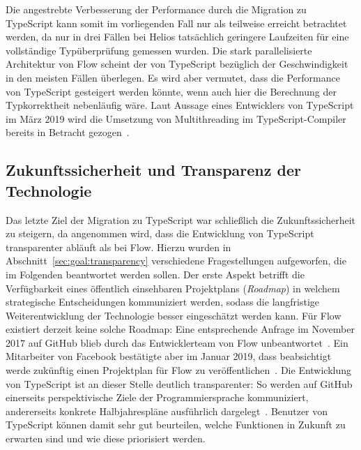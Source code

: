 Die angestrebte Verbesserung der Performance durch die Migration zu TypeScript kann somit im vorliegenden Fall nur als teilweise erreicht betrachtet werden, da nur in drei Fällen bei Helios tatsächlich geringere Laufzeiten für eine vollständige Typüberprüfung gemessen wurden. Die stark parallelisierte Architektur von Flow scheint der von TypeScript bezüglich der Geschwindigkeit in den meisten Fällen überlegen. Es wird aber vermutet, dass die Performance von TypeScript gesteigert werden könnte, wenn auch hier die Berechnung der Typkorrektheit nebenläufig wäre. Laut Aussage eines Entwicklers von TypeScript im März 2019 wird die Umsetzung von Multithreading im TypeScript-Compiler bereits in Betracht gezogen~\autocite{TS:MULTICORE}.

\subsection{Zukunftssicherheit und Transparenz der Technologie}

Das letzte Ziel der Migration zu TypeScript war schließlich die Zukunftssicherheit zu steigern, da angenommen wird, dass die Entwicklung von TypeScript transparenter abläuft als bei Flow. Hierzu wurden in Abschnitt~\ref{sec:goal:transparency} verschiedene Fragestellungen aufgeworfen, die im Folgenden beantwortet werden sollen.
Der erste Aspekt betrifft die Verfügbarkeit eines öffentlich einsehbaren Projektplans (\textit{Roadmap}) in welchem strategische Entscheidungen kommuniziert werden, sodass die langfristige Weiterentwicklung der Technologie besser eingeschätzt werden kann. Für Flow existiert derzeit keine solche Roadmap: Eine entsprechende Anfrage im November 2017 auf GitHub blieb durch das Entwicklerteam von Flow unbeantwortet~\autocite{FLOW:GITHUB:ROADMAP}. Ein Mitarbeiter von Facebook bestätigte aber im Januar 2019, dass beabsichtigt werde zukünftig einen Projektplan für Flow zu veröffentlichen~\autocite{FLOW:GITHUB:ROADMAP_FUTURE}. Die Entwicklung von TypeScript ist an dieser Stelle deutlich transparenter: So werden auf GitHub einerseits perspektivische Ziele der Programmiersprache kommuniziert, andererseits konkrete Halbjahrespläne ausführlich dargelegt~\autocite{TS:ROADMAP}. Benutzer von TypeScript können damit sehr gut beurteilen, welche Funktionen in Zukunft zu erwarten sind und wie diese priorisiert werden.

